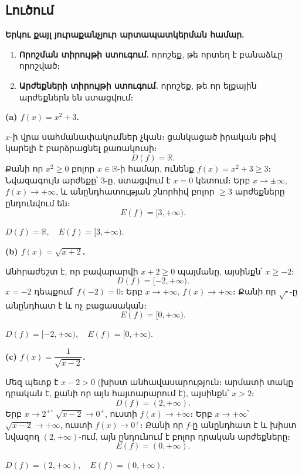 \documentclass[12pt, a4paper]{article}
\newcommand{\R}{\mathbb{R}}
\begin{document}
\subsection*{Լուծում}

\textbf{Երկու քայլ յուրաքանչյուր արտապատկերման համար.}
\begin{enumerate}[nosep]
  \item \textbf{Որոշման տիրույթի ստուգում.} որոշեք, թե որտեղ է բանաձևը որոշված։
  \item \textbf{Արժեքների տիրույթի ստուգում.} որոշեք, թե որ ելքային արժեքներն են ստացվում։
\end{enumerate}

\medskip

\textbf{(a)\; $f(x) = x^2 + 3$.}

$x$-ի վրա սահմանափակումներ չկան։ ցանկացած իրական թիվ կարելի է բարձրացնել քառակուսի։
\[
  D(f) = \R.
\]
Քանի որ $x^2 \ge 0$ բոլոր $x \in \R$-ի համար, ունենք $f(x) = x^2 + 3 \ge 3$։
Նվազագույն արժեքը՝ $3$-ը, ստացվում է $x = 0$ կետում։
Երբ $x \to \pm\infty$, $f(x) \to +\infty$, և անընդհատության շնորհիվ բոլոր $\ge 3$ արժեքները ընդունվում են։
\[
  E(f) = [3, +\infty).
\]

\begin{answerbox}
$D(f) = \R, \quad E(f) = [3, +\infty).$
\end{answerbox}

\bigskip
\textbf{(b)\; $f(x) = \sqrt{x+2}$.}

Անհրաժեշտ է, որ բավարարվի $x + 2 \ge 0$ պայմանը, այսինքն՝ $x \ge -2$։
\[
  D(f) = [-2, +\infty).
\]
$x = -2$ դեպքում՝ $f(-2) = 0$։ Երբ $x \to +\infty$, $f(x) \to +\infty$։
Քանի որ $\sqrt{\cdot}$-ը անընդհատ է և ոչ բացասական։
\[
  E(f) = [0, +\infty).
\]

\begin{answerbox}
$D(f) = [-2, +\infty), \quad E(f) = [0, +\infty).$
\end{answerbox}

\bigskip
\textbf{(c)\; $f(x) = \dfrac{1}{\sqrt{x-2}}$.}

Մեզ պետք է $x - 2 > 0$ (խիստ անհավասարություն։ արմատի տակը դրական է, քանի որ այն հայտարարում է), այսինքն՝ $x > 2$։
\[
  D(f) = (2, +\infty).
\]
Երբ $x \to 2^+$՝ $\sqrt{x-2} \to 0^+$, ուստի $f(x) \to +\infty$։
Երբ $x \to +\infty$՝ $\sqrt{x-2} \to +\infty$, ուստի $f(x) \to 0^+$։
Քանի որ $f$-ը անընդհատ է և խիստ նվազող $(2, +\infty)$-ում, այն ընդունում է բոլոր դրական արժեքները։
\[
  E(f) = (0, +\infty).
\]

\begin{answerbox}
$D(f) = (2, +\infty), \quad E(f) = (0, +\infty).$
\end{answerbox}
\end{document}
